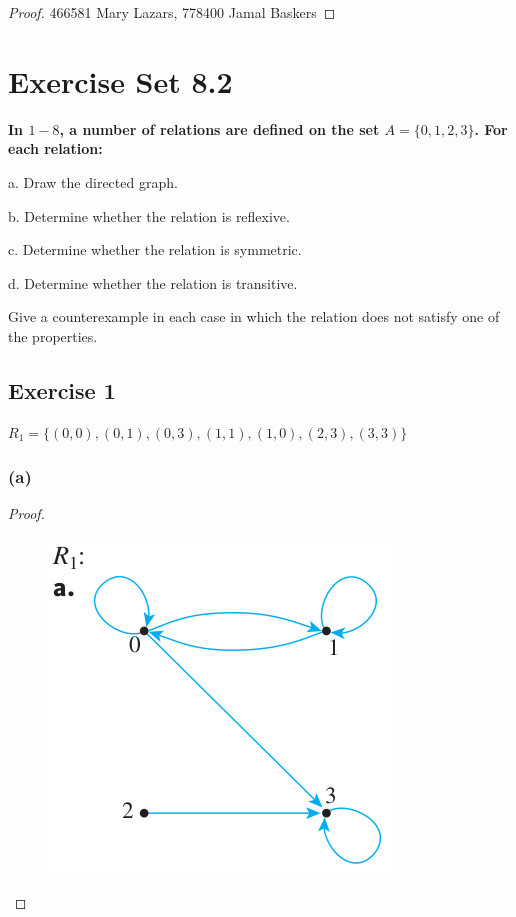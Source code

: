 \documentclass[14pt]{extarticle}
\newcommand{\cy}{\color{cyan}}
\begin{document}
\begin{proof}
        466581 Mary Lazars, 778400 Jamal Baskers
\end{proof}

\section{Exercise Set 8.2}

 {\bf \cy In $1-8$, a number of relations are defined on the set \(A = \{0, 1, 2, 3\}\). For each relation:

  a. Draw the directed graph.

  b. Determine whether the relation is reflexive.

  c. Determine whether the relation is symmetric.

  d. Determine whether the relation is transitive.

  Give a counterexample in each case in which the relation does not satisfy one of the properties.}

\subsection{Exercise 1}
\(R_1 = \{(0, 0), (0, 1), (0, 3), (1, 1), (1, 0), (2, 3), (3, 3)\}\)

\subsubsection{(a)}

\begin{proof}
        \begin{figure}[ht!]
                \centering
                \includegraphics[scale=0.35]{../images/8.2.1.a.png}
        \end{figure}
\end{proof}
\end{document}
